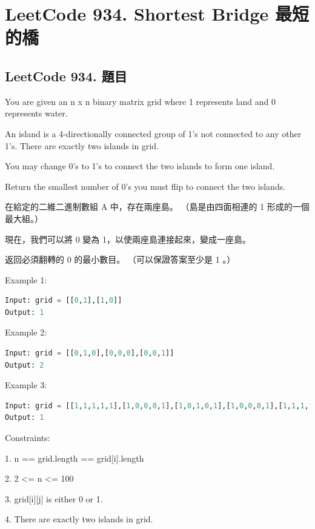 \documentclass[10pt,UTF8]{ctexart}
\begin{document}
\section{LeetCode 934. Shortest Bridge 最短的橋}

\subsection{LeetCode 934. 題目}

You are given an n x n binary matrix grid where 1 represents land and 0 represents water.

An island is a 4-directionally connected group of 1's not connected to any other 1's. There are exactly two islands in grid.

You may change 0's to 1's to connect the two islands to form one island.

Return the smallest number of 0's you must flip to connect the two islands.

在給定的二維二進制數組 A 中，存在兩座島。 （島是由四面相連的 1 形成的一個最大組。）

現在，我們可以將 0 變為 1，以使兩座島連接起來，變成一座島。

返回必須翻轉的 0 的最小數目。 （可以保證答案至少是 1 。）

Example 1:

\begin{lstlisting}[language={python}]
Input: grid = [[0,1],[1,0]]
Output: 1
\end{lstlisting}

Example 2:

\begin{lstlisting}[language={python}]
Input: grid = [[0,1,0],[0,0,0],[0,0,1]]
Output: 2
\end{lstlisting}

Example 3:

\begin{lstlisting}[language={python}]
Input: grid = [[1,1,1,1,1],[1,0,0,0,1],[1,0,1,0,1],[1,0,0,0,1],[1,1,1,1,1]]
Output: 1
\end{lstlisting}

Constraints:

1. n == grid.length == grid[i].length

2. 2 <= n <= 100

3. grid[i][j] is either 0 or 1.

4. There are exactly two islands in grid.
\end{document}
